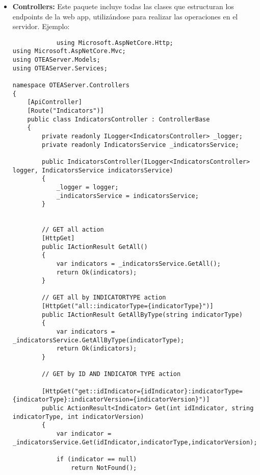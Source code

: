 \begin{itemize}
\begin{itemize}
\begin{lstlisting}
        [JsonProperty("indicatorVersion")]
        public int indicatorVersion { get; set; }
    }
}
        \end{lstlisting}
        Como se comprueba en el siguiente ejemplo, todos los campos del modelo
        de la clase \texttt{Indicator} tienen la propiedad de
        \textit{Newtonsoft.Json} denominada \texttt{JsonProperty}, la cual se
        utiliza para la serialización de los datos de este tipo para enviarlos
        en formato JSON.
        \item \textbf{Controllers: }Este paquete incluye todas las clases que estructuran los endpoints de la web app, utilizándose para realizar las operaciones en el servidor. Ejemplo:
        \begin{lstlisting}
            using Microsoft.AspNetCore.Http;
using Microsoft.AspNetCore.Mvc;
using OTEAServer.Models;
using OTEAServer.Services;

namespace OTEAServer.Controllers
{
    [ApiController]
    [Route("Indicators")]
    public class IndicatorsController : ControllerBase
    {
        private readonly ILogger<IndicatorsController> _logger;
        private readonly IndicatorsService _indicatorsService;

        public IndicatorsController(ILogger<IndicatorsController> logger, IndicatorsService indicatorsService)
        {
            _logger = logger;
            _indicatorsService = indicatorsService;
        }


        // GET all action
        [HttpGet]
        public IActionResult GetAll()
        {
            var indicators = _indicatorsService.GetAll();
            return Ok(indicators);
        }

        // GET all by INDICATORTYPE action
        [HttpGet("all::indicatorType={indicatorType}")]
        public IActionResult GetAllByType(string indicatorType)
        {
            var indicators = _indicatorsService.GetAllByType(indicatorType);
            return Ok(indicators);
        }

        // GET by ID AND INDICATOR TYPE action

        [HttpGet("get::idIndicator={idIndicator}:indicatorType={indicatorType}:indicatorVersion={indicatorVersion}")]
        public ActionResult<Indicator> Get(int idIndicator, string indicatorType, int indicatorVersion)
        {
            var indicator = _indicatorsService.Get(idIndicator,indicatorType,indicatorVersion);

            if (indicator == null)
                return NotFound();


\end{lstlisting}
\end{itemize}
\end{itemize}
